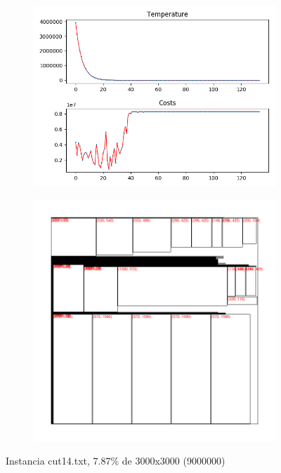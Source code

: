 \begin{figure}
\centering
\begin{subfigure}{.5\textwidth}
  \centering
  \includegraphics[width=1\linewidth]{results/cut14/2/plot}
  \label{fig:sub1}
\end{subfigure}%
\begin{subfigure}{.5\textwidth}
  \centering
  \includegraphics[width=1\linewidth]{results/cut14/2/cut}
  \label{fig:sub2}
\end{subfigure}
\caption{Instancia cut14.txt, 7.87\% de 3000x3000 (9000000)}
\label{fig:test}
\end{figure}


